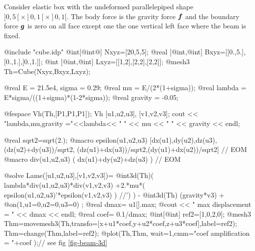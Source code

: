 \documentclass[a4paper,twoside,12pt]{book}
\def\vec#1{\mbox{\boldmath $#1$}}
\begin{document}
\begin{example}
Consider  elastic box  with the undeformed parallelepiped shape
$]0,5[\times ]0,1[\times]0,1[$.
The body force is the gravity force $\vec f$ and the
boundary force $\vec g$ is zero on all face except
one the one vertical left  face  where  the beam is fixed.

\bFF
@include "cube.idp"
@int[@int@]  Nxyz=[20,5,5];
@real [@int,@int]  Bxyz=[[0.,5.],[0.,1.],[0.,1.]];
@int [@int,@int]  Lxyz=[[1,2],[2,2],[2,2]];
@mesh3 Th=Cube(Nxyz,Bxyz,Lxyz);

@real E = 21.5e4, sigma = 0.29;
@real mu = E/(2*(1+sigma));
@real lambda = E*sigma/((1+sigma)*(1-2*sigma));
@real gravity = -0.05;

@fespace Vh(Th,[P1,P1,P1]);
Vh [u1,u2,u3], [v1,v2,v3];
cout << "lambda,mu,gravity ="<<lambda<< " " << mu << " " << gravity << endl;

@real sqrt2=sqrt(2.);
@macro epsilon(u1,u2,u3)  [dx(u1),dy(u2),dz(u3),(dz(u2)+dy(u3))/sqrt2,
                       (dz(u1)+dx(u3))/sqrt2,(dy(u1)+dx(u2))/sqrt2] // EOM
@macro div(u1,u2,u3) ( dx(u1)+dy(u2)+dz(u3) ) // EOM

@solve Lame([u1,u2,u3],[v1,v2,v3])=
  @int3d(Th)(
	    lambda*div(u1,u2,u3)*div(v1,v2,v3)	
	    +2.*mu*( epsilon(u1,u2,u3)'*epsilon(v1,v2,v3) ) //')
	      )
  - @int3d(Th) (gravity*v3)
  + @on(1,u1=0,u2=0,u3=0)
  ;
@real dmax= u1[].max;
@cout << " max displacement = " << dmax << endl;
@real coef= 0.1/dmax;
@int[@int] ref2=[1,0,2,0];
@mesh3 Thm=movemesh3(Th,transfo=[x+u1*coef,y+u2*coef,z+u3*coef],label=ref2);
Thm=change(Thm,label=ref2);
@plot(Th,Thm, wait=1,cmm="coef  amplification = "+coef );// see fig \ref{fig-beam-3d}
\eFF
\end{example}

\end{document}
